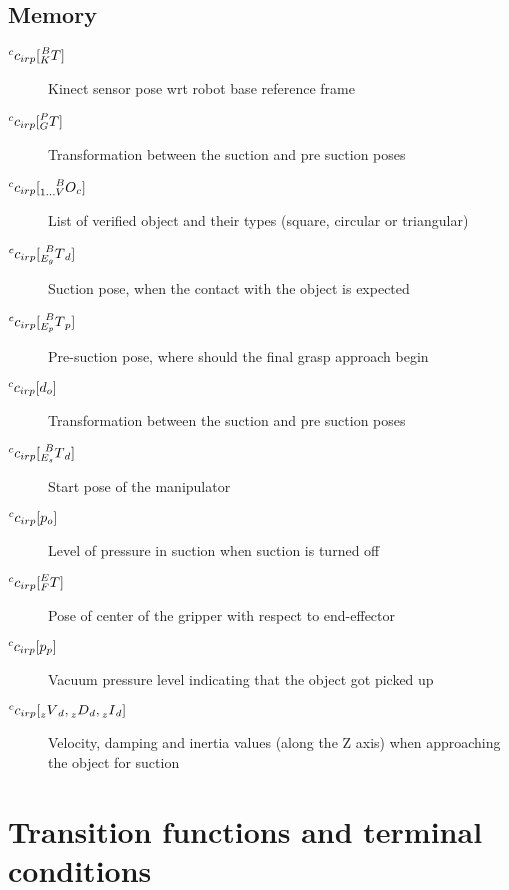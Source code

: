 \documentclass[12pt]{article}
\begin{document}
\subsection{Memory}
\begin{description}
\item[$\prescript{c}{}{c}_{irp}\lbrack\prescript{B}{K}{T}\rbrack$] Kinect sensor pose wrt robot base reference frame
\item[$\prescript{c}{}{c}_{irp} \lbrack \prescript{P}{G}{T} \rbrack $] Transformation between the suction and pre suction poses
\item[$\prescript{c}{}{c}_{irp} \lbrack \prescript{B}{1 \dots V}{O}_c \rbrack $] List of verified object and their types (square, circular or triangular)
\item[$\prescript{c}{}{c}_{irp} \lbrack \prescript{B}{E_g}{T}_d \rbrack $] Suction pose, when the contact with the object is expected
\item[$\prescript{c}{}{c}_{irp} \lbrack \prescript{B}{E_p}{T}_p \rbrack $] Pre-suction pose, where should the final grasp approach begin
\item[$\prescript{c}{}{c}_{irp} \lbrack d_o \rbrack $] Transformation between the suction and pre suction poses
\item[$\prescript{c}{}{c}_{irp} \lbrack \prescript{B}{E_s}{T}_d \rbrack $] Start pose of the manipulator
\item[$\prescript{c}{}{c}_{irp} \lbrack p_o \rbrack $] Level of pressure in suction when suction is turned off
\item[$\prescript{c}{}{c}_{irp} \lbrack \prescript{E}{F}T \rbrack $] Pose of center of the gripper with respect to end-effector 
\item[$\prescript{c}{}{c}_{irp} \lbrack p_p \rbrack $] Vacuum pressure level indicating that the object got picked up
\item[$\prescript{c}{}{c}_{irp} \lbrack \prescript{}{z}V_d, \prescript{}{z}D_d, \prescript{}{z}I_d \rbrack $] Velocity, damping and inertia values (along the Z axis) when approaching the object for suction
\end{description}

\section{Transition functions and terminal conditions}
\end{document}
